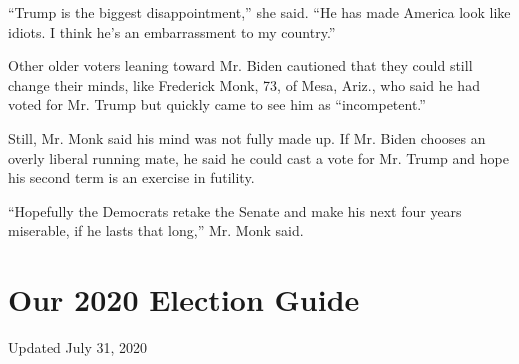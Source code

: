 ``Trump is the biggest disappointment,'' she said. ``He has made America
look like idiots. I think he's an embarrassment to my country.''

Other older voters leaning toward Mr. Biden cautioned that they could
still change their minds, like Frederick Monk, 73, of Mesa, Ariz., who
said he had voted for Mr. Trump but quickly came to see him as
``incompetent.''

Still, Mr. Monk said his mind was not fully made up. If Mr. Biden
chooses an overly liberal running mate, he said he could cast a vote for
Mr. Trump and hope his second term is an exercise in futility.

``Hopefully the Democrats retake the Senate and make his next four years
miserable, if he lasts that long,'' Mr. Monk said.

\hypertarget{our-2020-election-guide}{%
\section{Our 2020 Election Guide}\label{our-2020-election-guide}}

Updated July 31, 2020

